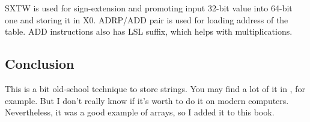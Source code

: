 SXTW is used for sign-extension and promoting input 32-bit value into 64-bit one and storing it in X0.
ADRP/ADD pair is used for loading address of the table.
ADD instructions also has LSL suffix, which helps with multiplications.
\fi

\subsection{Conclusion}

This is a bit old-school technique to store strings.
You may find a lot of it in \oracle, for example.
But I don't really know if it's worth to do it on modern computers.
Nevertheless, it was a good example of arrays, so I added it to this book.
\fi
